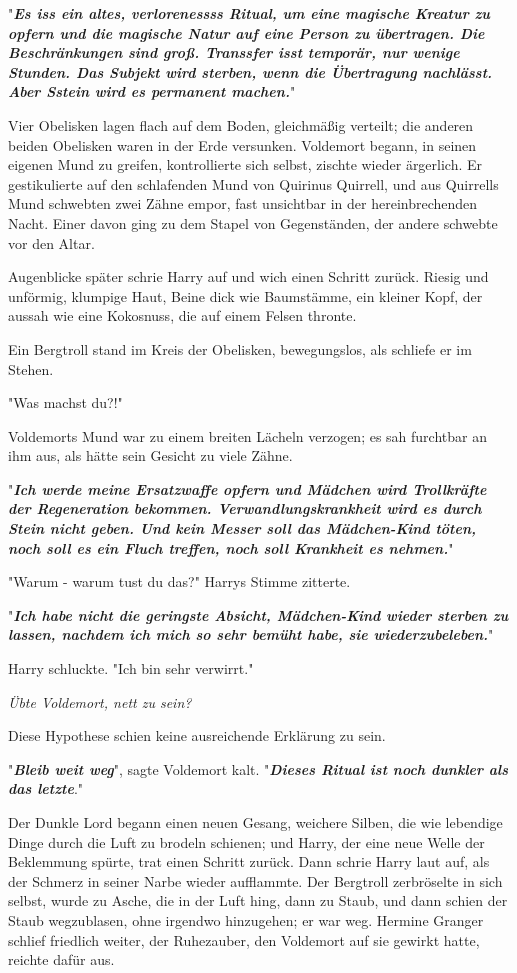 {"\textbf{\emph{Es iss ein altes, verlorenessss Ritual, um eine magische Kreatur zu opfern und die magische Natur auf eine Person zu übertragen. Die Beschränkungen sind groß. Transsfer isst temporär, nur wenige Stunden. Das Subjekt wird sterben, wenn die Übertragung nachlässt. Aber Sstein wird es permanent machen.}}"

Vier Obelisken lagen flach auf dem Boden, gleichmäßig verteilt; die anderen beiden Obelisken waren in der Erde versunken. Voldemort begann, in seinen eigenen Mund zu greifen, kontrollierte sich selbst, zischte wieder ärgerlich. Er gestikulierte auf den schlafenden Mund von Quirinus Quirrell, und aus Quirrells Mund schwebten zwei Zähne empor, fast unsichtbar in der hereinbrechenden Nacht. Einer davon ging zu dem Stapel von Gegenständen, der andere schwebte vor den Altar.

Augenblicke später schrie Harry auf und wich einen Schritt zurück. Riesig und unförmig, klumpige Haut, Beine dick wie Baumstämme, ein kleiner Kopf, der aussah wie eine Kokosnuss, die auf einem Felsen thronte.

Ein Bergtroll stand im Kreis der Obelisken, bewegungslos, als schliefe er im Stehen.

"Was machst du?!"

Voldemorts Mund war zu einem breiten Lächeln verzogen; es sah furchtbar an ihm aus, als hätte sein Gesicht zu viele Zähne.

"\textbf{\emph{Ich werde meine Ersatzwaffe opfern und Mädchen wird Trollkräfte der Regeneration bekommen. Verwandlungskrankheit wird es durch Stein nicht geben. Und kein Messer soll das Mädchen-Kind töten, noch soll es ein Fluch treffen, noch soll Krankheit es nehmen.}}"

"Warum - warum tust du das?" Harrys Stimme zitterte.

"\textbf{\emph{Ich habe nicht die geringste Absicht, Mädchen-Kind wieder sterben zu lassen, nachdem ich mich so sehr bemüht habe, sie wiederzubeleben.}}"

Harry schluckte. "Ich bin sehr verwirrt."

\emph{Übte Voldemort, nett zu sein?}

Diese Hypothese schien keine ausreichende Erklärung zu sein.

"\textbf{\emph{Bleib weit weg}}", sagte Voldemort kalt. "\textbf{\emph{Dieses Ritual ist noch dunkler als das letzte}}."

Der Dunkle Lord begann einen neuen Gesang, weichere Silben, die wie lebendige Dinge durch die Luft zu brodeln schienen; und Harry, der eine neue Welle der Beklemmung spürte, trat einen Schritt zurück. Dann schrie Harry laut auf, als der Schmerz in seiner Narbe wieder aufflammte. Der Bergtroll zerbröselte in sich selbst, wurde zu Asche, die in der Luft hing, dann zu Staub, und dann schien der Staub wegzublasen, ohne irgendwo hinzugehen; er war weg. Hermine Granger schlief friedlich weiter, der Ruhezauber, den Voldemort auf sie gewirkt hatte, reichte dafür aus.

}
